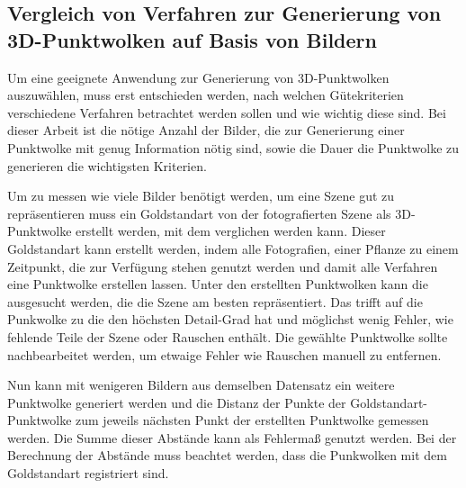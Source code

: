 \documentclass[12pt,titlepage, twoside]{article}
\begin{document}
\subsection{Vergleich von Verfahren zur Generierung von 3D-Punktwolken auf Basis von Bildern}

Um eine geeignete Anwendung zur Generierung von 3D-Punktwolken auszuwählen, muss erst entschieden werden, nach welchen Gütekriterien verschiedene Verfahren betrachtet werden sollen und wie wichtig diese sind.
Bei dieser Arbeit ist die nötige Anzahl der Bilder, die zur Generierung einer Punktwolke mit genug Information nötig sind, sowie die Dauer die Punktwolke zu generieren die wichtigsten Kriterien.

Um zu messen wie viele Bilder benötigt werden, um eine Szene gut zu repräsentieren muss ein Goldstandart von der fotografierten Szene als 3D-Punktwolke erstellt werden, mit dem verglichen werden kann.
Dieser Goldstandart kann erstellt werden, indem alle Fotografien, einer Pflanze zu einem Zeitpunkt, die zur Verfügung stehen genutzt werden und damit alle Verfahren eine Punktwolke erstellen lassen. 
Unter den erstellten Punktwolken kann die ausgesucht werden, die die Szene am besten repräsentiert. 
Das trifft auf die Punkwolke zu die den höchsten Detail-Grad hat und möglichst wenig Fehler, wie fehlende Teile der Szene oder Rauschen enthält.
Die gewählte Punktwolke sollte nachbearbeitet werden, um etwaige Fehler wie Rauschen manuell zu entfernen.

Nun kann mit wenigeren Bildern aus demselben Datensatz ein weitere Punktwolke generiert werden und die Distanz der Punkte der Goldstandart-Punktwolke zum jeweils nächsten Punkt der erstellten Punktwolke gemessen werden.
Die Summe dieser Abstände kann als Fehlermaß genutzt werden. Bei der Berechnung der Abstände muss beachtet werden, dass die Punkwolken mit dem Goldstandart registriert sind.
\end{document}
